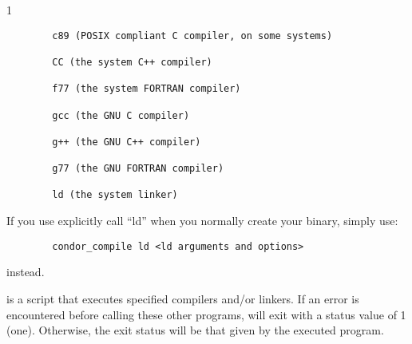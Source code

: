 \begin{ManPage}{\label{man-condor-compile}}{1}
\begin{verbatim}
        c89 (POSIX compliant C compiler, on some systems) 

        CC (the system C++ compiler) 

        f77 (the system FORTRAN compiler) 

        gcc (the GNU C compiler) 

        g++ (the GNU C++ compiler) 

        g77 (the GNU FORTRAN compiler) 

        ld (the system linker) 
\end{verbatim}

\Note If you use explicitly call ``ld'' when you normally create
your binary, simply use:
\begin{verbatim}
        condor_compile ld <ld arguments and options>
\end{verbatim}
instead.  

\ExitStatus

 is a script that executes specified compilers and/or linkers.
If an error is encountered before calling these other programs,
 will exit with a status value of 1 (one).
Otherwise, the exit status will be that given by the executed program.

\end{ManPage}
